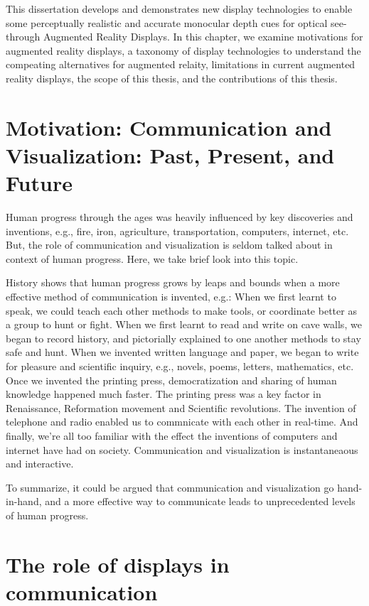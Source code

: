 This dissertation develops and demonstrates new display technologies to enable some perceptually realistic and accurate monocular depth cues for optical see-through Augmented Reality Displays. In this chapter, we examine motivations for augmented reality displays, a taxonomy of display technologies to understand the compeating alternatives for augmented relaity, limitations in current augmented reality displays, the scope of this thesis, and the contributions of this thesis.

\section{Motivation: Communication and Visualization: Past, Present, and Future}
Human progress through the ages was heavily influenced by key discoveries and inventions, e.g., fire, iron, agriculture, transportation, computers, internet, etc. But, the role of communication and visualization is seldom talked about in context of human progress. Here, we take brief look into this topic. 

History shows that human progress grows by leaps and bounds when a more effective method of communication is invented, e.g.: When we first learnt to speak, we could teach each other methods to make tools, or coordinate better as a group to hunt or fight. 
When we first learnt to read and write on cave walls, we began to record history, and pictorially explained to one another methods to stay safe and hunt.
When we invented written language and paper, we began to write for pleasure and scientific inquiry, e.g., novels, poems, letters, mathematics, etc. 
Once we invented the printing press, democratization and sharing of human knowledge happened much faster. 
The printing press was a key factor in Renaissance, Reformation movement and Scientific revolutions.
The invention of telephone and radio enabled us to commnicate with each other in real-time. 
And finally, we're all too familiar with the effect the inventions of computers and internet have had on society. 
Communication and visualization is instantaneaous and interactive.

To summarize, it could be argued that communication and visualization go hand-in-hand, and a more effective way to communicate leads to unprecedented levels of human progress.


\section{The role of displays in communication}

